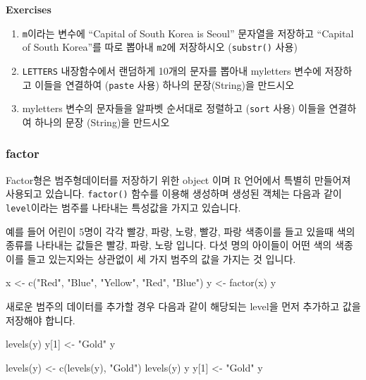 \documentclass[
  a4paper,
]{book}
\newenvironment{Shaded}{\begin{snugshade}}{\end{snugshade}}
\newcommand{\DecValTok}[1]{\textcolor[rgb]{0.68,0.00,0.00}{#1}}
\newcommand{\FunctionTok}[1]{\textcolor[rgb]{0.28,0.35,0.67}{#1}}
\newcommand{\NormalTok}[1]{\textcolor[rgb]{0.00,0.23,0.31}{#1}}
\newcommand{\OtherTok}[1]{\textcolor[rgb]{0.00,0.23,0.31}{#1}}
\newcommand{\StringTok}[1]{\textcolor[rgb]{0.13,0.47,0.30}{#1}}
\begin{document}
\textbf{Exercises}

\begin{enumerate}
\def\labelenumi{\arabic{enumi})}
\item
  \texttt{m}이라는 변수에 ``Capital of South Korea is Seoul'' 문자열을
  저장하고 ``Capital of South Korea''를 따로 뽑아내 \texttt{m2}에
  저장하시오 (\texttt{substr()} 사용)
\item
  \texttt{LETTERS} 내장함수에서 랜덤하게 10개의 문자를 뽑아내 myletters
  변수에 저장하고 이들을 연결하여 (\texttt{paste} 사용) 하나의
  문장(String)을 만드시오
\item
  myletters 변수의 문자들을 알파벳 순서대로 정렬하고 (\texttt{sort}
  사용) 이들을 연결하여 하나의 문장 (String)을 만드시오
\end{enumerate}

\hypertarget{factor}{%
\subsubsection{factor}\label{factor}}

Factor형은 범주형데이터를 저장하기 위한 object 이며 R 언어에서 특별히
만들어져 사용되고 있습니다. \texttt{factor()} 함수를 이용해 생성하며
생성된 객체는 다음과 같이 \texttt{level}이라는 범주를 나타내는 특성값을
가지고 있습니다.

예를 들어 어린이 5명이 각각 빨강, 파랑, 노랑, 빨강, 파랑 색종이를 들고
있을때 색의 종류를 나타내는 값들은 빨강, 파랑, 노랑 입니다. 다섯 명의
아이들이 어떤 색의 색종이를 들고 있는지와는 상관없이 세 가지 범주의 값을
가지는 것 입니다.

\begin{Shaded}
\begin{Highlighting}[]
\NormalTok{x }\OtherTok{\textless{}{-}} \FunctionTok{c}\NormalTok{(}\StringTok{"Red"}\NormalTok{, }\StringTok{"Blue"}\NormalTok{, }\StringTok{"Yellow"}\NormalTok{, }\StringTok{"Red"}\NormalTok{, }\StringTok{"Blue"}\NormalTok{)}
\NormalTok{y }\OtherTok{\textless{}{-}} \FunctionTok{factor}\NormalTok{(x)}
\NormalTok{y}
\end{Highlighting}
\end{Shaded}

새로운 범주의 데이터를 추가할 경우 다음과 같이 해당되는 level을 먼저
추가하고 값을 저장해야 합니다.

\begin{Shaded}
\begin{Highlighting}[]
\FunctionTok{levels}\NormalTok{(y)}
\NormalTok{y[}\DecValTok{1}\NormalTok{] }\OtherTok{\textless{}{-}} \StringTok{"Gold"}
\NormalTok{y}

\FunctionTok{levels}\NormalTok{(y) }\OtherTok{\textless{}{-}} \FunctionTok{c}\NormalTok{(}\FunctionTok{levels}\NormalTok{(y), }\StringTok{"Gold"}\NormalTok{)}
\FunctionTok{levels}\NormalTok{(y)}
\NormalTok{y}
\NormalTok{y[}\DecValTok{1}\NormalTok{] }\OtherTok{\textless{}{-}} \StringTok{"Gold"}
\NormalTok{y}
\end{Highlighting}
\end{Shaded}
\end{document}
